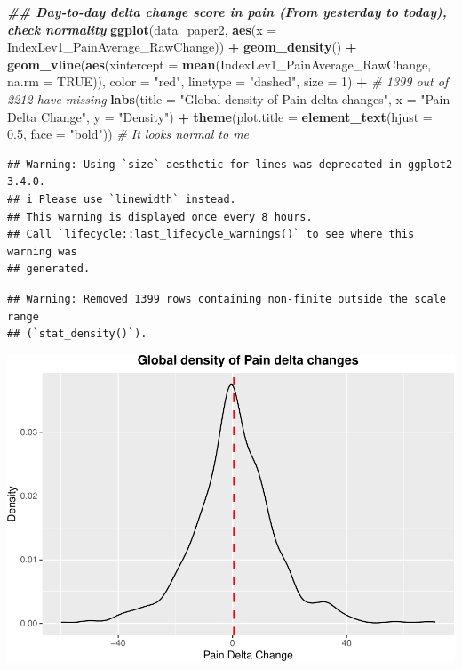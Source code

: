\documentclass[
  12pt,
]{article}
\newenvironment{Shaded}{\begin{snugshade}}{\end{snugshade}}
\newcommand{\AttributeTok}[1]{\textcolor[rgb]{0.13,0.29,0.53}{#1}}
\newcommand{\CommentTok}[1]{\textcolor[rgb]{0.56,0.35,0.01}{\textit{#1}}}
\newcommand{\ConstantTok}[1]{\textcolor[rgb]{0.56,0.35,0.01}{#1}}
\newcommand{\DecValTok}[1]{\textcolor[rgb]{0.00,0.00,0.81}{#1}}
\newcommand{\DocumentationTok}[1]{\textcolor[rgb]{0.56,0.35,0.01}{\textbf{\textit{#1}}}}
\newcommand{\FloatTok}[1]{\textcolor[rgb]{0.00,0.00,0.81}{#1}}
\newcommand{\FunctionTok}[1]{\textcolor[rgb]{0.13,0.29,0.53}{\textbf{#1}}}
\newcommand{\NormalTok}[1]{#1}
\newcommand{\SpecialCharTok}[1]{\textcolor[rgb]{0.81,0.36,0.00}{\textbf{#1}}}
\newcommand{\StringTok}[1]{\textcolor[rgb]{0.31,0.60,0.02}{#1}}
\begin{document}
\begin{Shaded}
\begin{Highlighting}[]
\DocumentationTok{\#\# Day{-}to{-}day delta change score in pain (From yesterday to today), check normality}
\FunctionTok{ggplot}\NormalTok{(data\_paper2, }\FunctionTok{aes}\NormalTok{(}\AttributeTok{x =}\NormalTok{ IndexLev1\_PainAverage\_RawChange)) }\SpecialCharTok{+} 
  \FunctionTok{geom\_density}\NormalTok{() }\SpecialCharTok{+}
  \FunctionTok{geom\_vline}\NormalTok{(}\FunctionTok{aes}\NormalTok{(}\AttributeTok{xintercept =} \FunctionTok{mean}\NormalTok{(IndexLev1\_PainAverage\_RawChange, }\AttributeTok{na.rm =} \ConstantTok{TRUE}\NormalTok{)), }
             \AttributeTok{color =} \StringTok{"red"}\NormalTok{, }\AttributeTok{linetype =} \StringTok{"dashed"}\NormalTok{, }\AttributeTok{size =} \DecValTok{1}\NormalTok{) }\SpecialCharTok{+} \CommentTok{\# 1399 out of 2212 have missing}
  \FunctionTok{labs}\NormalTok{(}\AttributeTok{title =} \StringTok{"Global density of Pain delta changes"}\NormalTok{, }
       \AttributeTok{x =} \StringTok{"Pain Delta Change"}\NormalTok{, }
       \AttributeTok{y =} \StringTok{"Density"}\NormalTok{) }\SpecialCharTok{+}
  \FunctionTok{theme}\NormalTok{(}\AttributeTok{plot.title =} \FunctionTok{element\_text}\NormalTok{(}\AttributeTok{hjust =} \FloatTok{0.5}\NormalTok{, }\AttributeTok{face =} \StringTok{"bold"}\NormalTok{)) }\CommentTok{\# It looks normal to me }
\end{Highlighting}
\end{Shaded}

\begin{verbatim}
## Warning: Using `size` aesthetic for lines was deprecated in ggplot2 3.4.0.
## i Please use `linewidth` instead.
## This warning is displayed once every 8 hours.
## Call `lifecycle::last_lifecycle_warnings()` to see where this warning was
## generated.
\end{verbatim}

\begin{verbatim}
## Warning: Removed 1399 rows containing non-finite outside the scale range
## (`stat_density()`).
\end{verbatim}

\includegraphics{Martel-Paper_files/figure-latex/unnamed-chunk-15-1.pdf}
\end{document}
